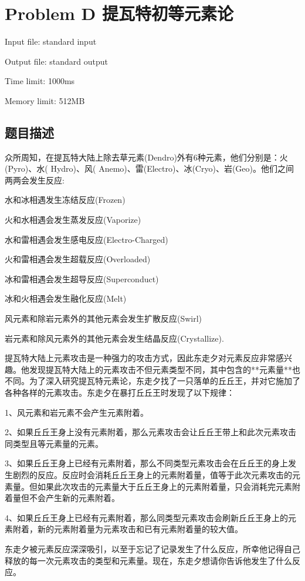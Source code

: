 \newpage
\section{Problem D 提瓦特初等元素论}
{ \limitfont{}
Input file: standard input \par
Output file: standard output \par
Time limit: 1000ms \par
Memory limit: 512MB \par
}
\subsection*{题目描述}

众所周知，在提瓦特大陆上除去草元素(Dendro)外有6种元素，他们分别是：火(Pyro)、水( Hydro)、风( Anemo)、雷(Electro)、冰(Cryo)、岩(Geo)。他们之间两两会发生反应:

水和冰相遇发生冻结反应(Frozen)

火和水相遇会发生蒸发反应(Vaporize)

水和雷相遇会发生感电反应(Electro-Charged)

火和雷相遇会发生超载反应(Overloaded)

冰和雷相遇会发生超导反应(Superconduct)

冰和火相遇会发生融化反应(Melt)

风元素和除岩元素外的其他元素会发生扩散反应(Swirl)

岩元素和除风元素外的其他元素会发生结晶反应(Crystallize).

提瓦特大陆上元素攻击是一种强力的攻击方式，因此东走夕对元素反应非常感兴趣。他发现提瓦特大陆上的元素攻击不但元素类型不同，其中包含的**元素量**也不同。为了深入研究提瓦特元素论，东走夕找了一只落单的丘丘王，并对它施加了各种各样的元素攻击。东走夕在暴打丘丘王时发现了以下规律：

1、风元素和岩元素不会产生元素附着。

2、如果丘丘王身上没有元素附着，那么元素攻击会让丘丘王带上和此次元素攻击同类型且等元素量的元素。

3、如果丘丘王身上已经有元素附着，那么不同类型元素攻击会在丘丘王的身上发生剧烈的反应。反应时会消耗丘丘王身上的元素附着量，值等于此次元素攻击的元素量。但如果此次攻击的元素量大于丘丘王身上的元素附着量，只会消耗完元素附着量但不会产生新的元素附着。

4、如果丘丘王身上已经有元素附着，那么同类型元素攻击会刷新丘丘王身上的元素附着，新的元素附着量为元素攻击和已有元素附着量的较大值。



东走夕被元素反应深深吸引，以至于忘记了记录发生了什么反应，所幸他记得自己释放的每一次元素攻击的类型和元素量。现在，东走夕想请你告诉他发生了什么反应。

